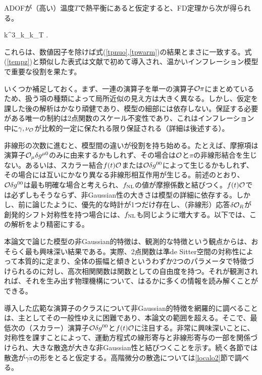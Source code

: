 ADOFが（高い）温度$T$で熱平衡にあると仮定すると、FD定理から次が得られる。

\beq
\label{tempz}
k^3\langle\zeta_k\zeta_k\rangle_T \simeq  {} .
\eeq

これらは、数値因子を除けば式(\ref{tpnuo},\ref{tpwarm})の結果とまさに一致する。式(\ref{tempz})と類似した表式は文献\cite{berera1,berera2}で初めて導入され、温かいインフレーション模型\cite{warm}で重要な役割を果たす。

いくつか補足しておく。まず、一連の演算子を単一の演算子${\cal O}\pi$にまとめているため、扱う項の種類によって局所近似の見え方は大きく異なる。しかし、仮定を課した後の解析はかなり頑健であり、模型の細部には依存しない。保証する必要がある唯一の制約は2点関数のスケール不変性であり、これはインフレーション中に$\gamma,\nu_{{\cal O}}$が比較的一定に保たれる限り保証される（詳細は後述する）。

非線形の次数に進むと、模型間の違いが役割を持ち始める。たとえば、摩擦項は演算子${\cal O}_\mu\delta g^{\mu0}$のみに由来するかもしれず、その場合は${\cal O}$と$\pi$の非線形結合を生じない。あるいは、スカラー結合$f(t){\cal O}$または${\cal O}\delta g^{00}$によって生じるかもしれず、その場合には互いにかなり異なる非線形相互作用が生じる。前述のとおり、${\cal O}\delta g^{00}$は最も明確な場合と考えられ、$f_{\rm NL}$の値が摩擦係数と結びつく。$f(t){\cal O}$では必ずしもそうならず、非Gaussian性の大きさは模型の詳細に依存する。しかし、前に論じたように、優先的な時計が1つだけ存在し、（非線形）応答$\delta{\cal O}_R$が創発的シフト対称性を持つ場合には、$f_{\rm NL}$も同じように増大する。以下では、この解析をより精密にする。

\label{nongaus}

本論文で論じた模型の非Gaussian的特徴は、観測的な特徴という観点からは、おそらく最も興味深い結果である。実際、2点関数は準de Sitter空間の対称性によって本質的に定まり、全体の振幅と傾きというわずか2つのパラメータで特徴づけられるのに対し、高次相関関数は関数としての自由度を持つ。それが観測されれば、それを生み出す物理機構について、はるかに多くの情報を読み解くことができる。

導入した広範な演算子のクラスについて非Gaussian的特徴を網羅的に調べることは、主としてその一般性ゆえに困難であり、本論文の範囲を超える。そこで、最低次の（スカラー）演算子${\cal O}\delta g^{00}$と$f(t){\cal O}$に注目する。非常に興味深いことに、対称性を課すことによって、運動方程式の線形寄与と非線形寄与の一部を関係づけられ、大きな散逸が大きな非Gaussian性と結びつくことを示す。続く各節では散逸が$\gamma\dot\pi$の形をとると仮定する。高階微分の散逸については\ref{localo2}節で調べる。

